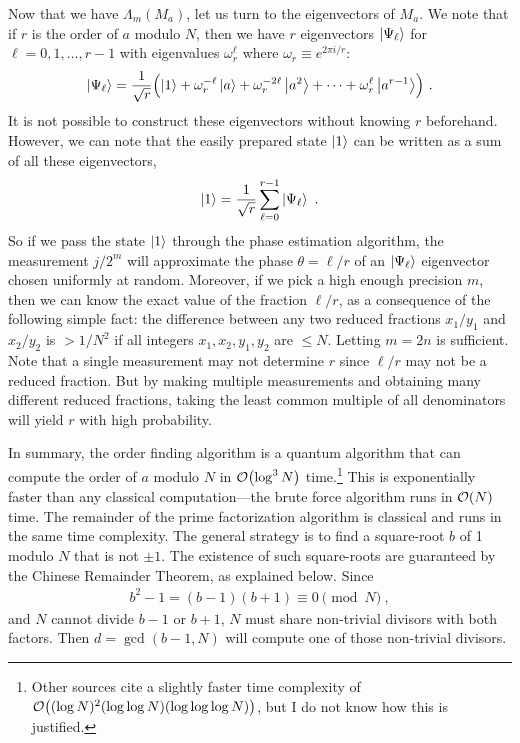 \documentclass{article}
\numberwithin{equation}{section} 		%
\begin{document}
Now that we have $\Lambda_m(M_a)$, let us turn to the eigenvectors of $M_a$.
We note that if $r$ is the order of $a$ modulo $N$, then we have $r$ eigenvectors $\ket{\Psi_\ell}$ for $\ell = 0, 1, \dotsc, r-1$ with eigenvalues $\omega_r^\ell$ where $\omega_r \equiv e^{2\pi i / r}$:
\begin{align}
	\ket{\Psi_\ell} = \frac{1}{\sqrt{r}} \qty\Big( \ket{1} + \omega_r^{-\ell} \ket{a} + \omega_r^{-2\ell} \ket{a^2} + \cdots + \omega_r^\ell \ket{a^{r-1}} ) ~.
\end{align}
It is not possible to construct these eigenvectors without knowing $r$ beforehand.
However, we can note that the easily prepared state $\ket{1}$ can be written as a sum of all these eigenvectors,
\begin{align}
	\ket{1} = \frac{1}{\sqrt{r}} \sum_{\ell=0}^{r-1} \ket{\Psi_\ell} ~.
\end{align}
So if we pass the state $\ket{1}$ through the phase estimation algorithm, the measurement $j/2^m$ will approximate the phase $\theta = \ell/r$ of an $\ket{\Psi_\ell}$ eigenvector chosen uniformly at random.
Moreover, if we pick a high enough precision $m$, then we can know the exact value of the fraction $\ell/r$, as a consequence of the following simple fact: the difference between any two reduced fractions $x_1/y_1$ and $x_2/y_2$ is $> 1/N^2$ if all integers $x_1, x_2, y_1, y_2$ are $ \leq N$.
Letting $m = 2n$ is sufficient.
Note that a single measurement may not determine $r$ since $\ell/r$ may not be a reduced fraction.
But by making multiple measurements and obtaining many different reduced fractions, taking the least common multiple of all denominators will yield $r$ with high probability.

\noindent \hrulefill

In summary, the order finding algorithm is a quantum algorithm that can compute the order of $a$ modulo $N$ in $\order{\log^3 N}$ time.\footnote{Other sources cite a slightly faster time complexity of $\order{(\log N)^2 (\log \log N) (\log \log \log N)}$, but I do not know how this is justified.}
This is exponentially faster than any classical computation---the brute force algorithm runs in $\order{N}$ time.
The remainder of the prime factorization algorithm is classical and runs in the same time complexity.
The general strategy is to find a square-root $b$ of 1 modulo $N$ that is not $\pm 1$.
The existence of such square-roots are guaranteed by the Chinese Remainder Theorem, as explained below.
Since
\begin{align}
	b^2 - 1 = (b-1)(b+1) \equiv 0 \pmod N ~,
\end{align}
and $N$ cannot divide $b-1$ or $b+1$, $N$ must share non-trivial divisors with both factors.
Then $d = \gcd(b-1, N)$ will compute one of those non-trivial divisors.
\end{document}
